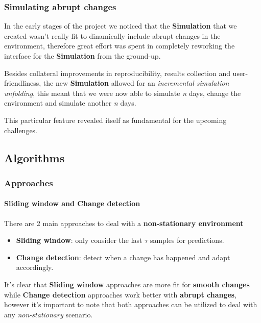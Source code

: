 
\begin{frame}
\frametitle{Simulating abrupt changes}

In the early stages of the project we noticed that the \textbf{Simulation} that we created wasn't really fit to dinamically include abrupt changes in the environment, therefore great effort was spent in completely reworking the interface for the \textbf{Simulation} from the ground-up.

Besides collateral improvements in reproducibility, results collection and user-friendliness, the new \textbf{Simulation} allowed for an \textit{incremental simulation unfolding}, this meant that we were now able to simulate \textit{n} days, change the environment and simulate another \textit{n} days.

This particular feature revealed itself as fundamental for the upcoming challenges.

\end{frame}


\subsection{Algorithms}


\begin{frame}
\frametitle{Approaches}
\framesubtitle{Sliding window and Change detection}

There are 2 main approaches to deal with a \textbf{non-stationary environment}
\begin{itemize}[label={$\circ$}]
    \item \textbf{Sliding window}: only consider the last $\tau$ samples for predictions.
    \item \textbf{Change detection}: detect when a change has happened and adapt accordingly.
\end{itemize}

It's clear that \textbf{Sliding window} approaches are more fit for \textbf{smooth changes} while \textbf{Change detection} approaches work better with \textbf{abrupt changes}, however it's important to note that both approaches can be utilized to deal with any \textit{non-stationary} scenario.

\end{frame}

